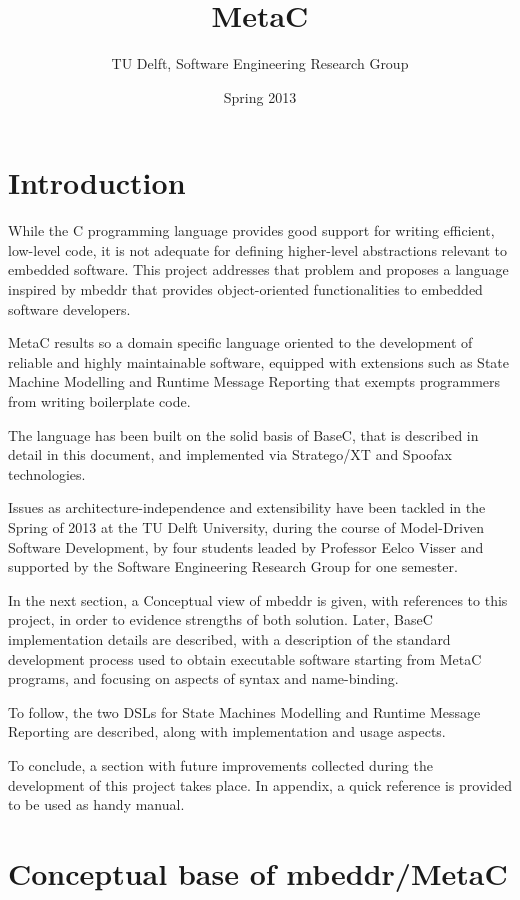 \documentclass[a4paper,10pt,titlepage]{report}
\title{MetaC}
\author{TU Delft, Software Engineering Research Group}
\date{Spring 2013}
\begin{document}
\maketitle

\chapter{Introduction}

While the C programming language provides good support for writing efficient, low-level code, it is not adequate for defining higher-level abstractions relevant to embedded software. This project addresses that problem and proposes a language inspired by mbeddr \cite{voelter2012mbeddr} that provides object-oriented functionalities to embedded software developers. 

MetaC results so a domain specific language oriented to the development of reliable and highly maintainable software, equipped with extensions such as State Machine Modelling and Runtime Message Reporting that exempts programmers from writing boilerplate code.

The language has been built on the solid basis of BaseC, that is described in detail in this document, and implemented via Stratego/XT \cite{visser2004program} and Spoofax \cite{kalleberg2007spoofax} technologies. 

Issues as architecture-independence and extensibility have been tackled in the Spring of 2013 at the TU Delft University, during the course of Model-Driven Software Development, by four students leaded by Professor Eelco Visser and supported by the Software Engineering Research Group for one semester.

In the next section, a Conceptual view of mbeddr is given, with references to this project, in order to evidence strengths of both solution. Later, BaseC implementation details are described, with a description of the standard development process used to obtain executable software starting from MetaC programs, and focusing on aspects of syntax and name-binding. 

To follow, the two DSLs for State Machines Modelling and Runtime Message Reporting are described, along with implementation and usage aspects. 

To conclude, a section with future improvements collected during the development of this project takes place. In appendix, a quick reference is provided to be used as handy manual.

\chapter{Conceptual base of mbeddr/MetaC}
\end{document}
